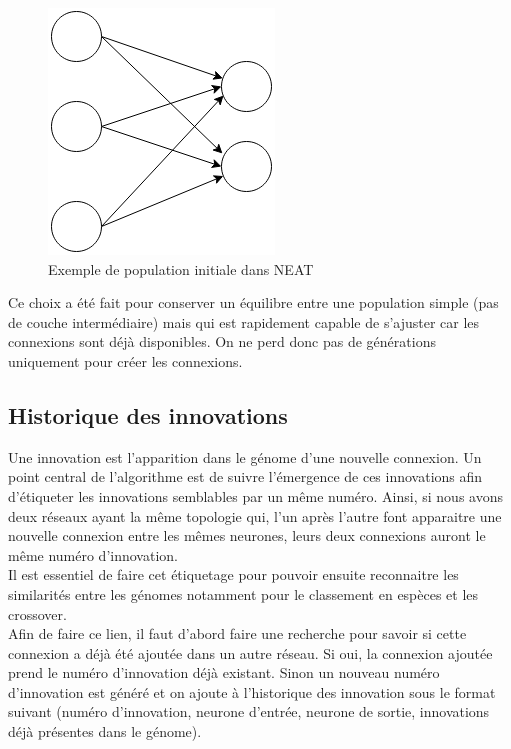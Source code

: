 \documentclass{article}
\begin{document}
\begin{figure}[H]
\begin{center}
	\includegraphics[scale=0.6]{initneat.png}
	\caption{Exemple de population initiale dans NEAT}
\end{center}
\end{figure}

Ce choix a été fait pour conserver un équilibre entre une population simple (pas de couche intermédiaire) mais qui est rapidement capable de s'ajuster car les connexions sont déjà disponibles. On ne perd donc pas de générations uniquement pour créer les connexions.

\subsection{Historique des innovations}

Une innovation est l'apparition dans le génome d'une nouvelle connexion. Un point central de l'algorithme est de suivre l'émergence de ces innovations afin d'étiqueter les innovations semblables par un même numéro. Ainsi, si nous avons deux réseaux ayant la même topologie qui, l'un après l'autre font apparaitre une nouvelle connexion entre les mêmes neurones, leurs deux connexions auront le même numéro d'innovation.\\

Il est essentiel de faire cet étiquetage pour pouvoir ensuite reconnaitre les similarités entre les génomes notamment pour le classement en espèces et les crossover.\\
	
Afin de faire ce lien, il faut d'abord faire une recherche pour savoir si cette connexion a déjà été ajoutée dans un autre réseau. Si oui, la connexion ajoutée prend le numéro d'innovation déjà existant. Sinon un nouveau numéro d'innovation est généré et on ajoute à l'historique des innovation sous le format suivant (numéro d'innovation, neurone d'entrée, neurone de sortie, innovations déjà présentes dans le génome).\\
\end{document}
